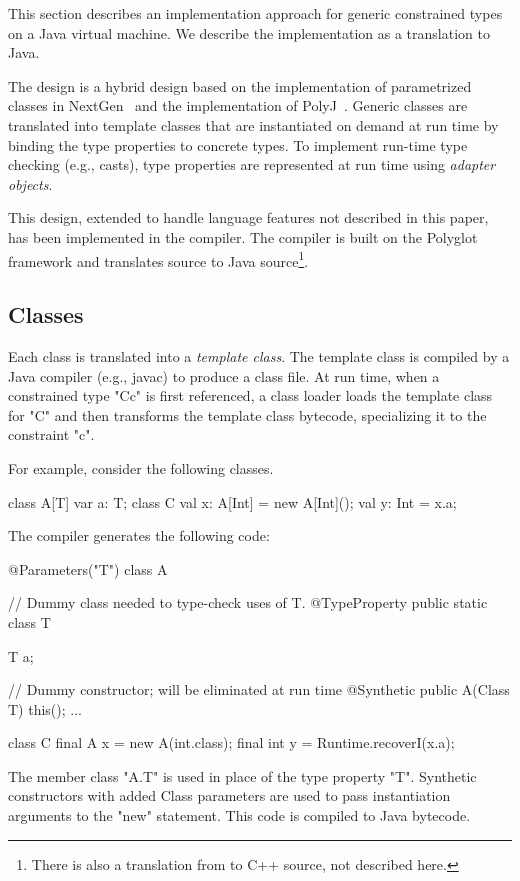 This section describes an implementation approach for
generic constrained types on a Java virtual machine.
We describe the implementation as a translation to Java.

The design is a hybrid design based on the implementation of
parametrized classes in NextGen~\cite{nextgen,allen03,allen04} and the
implementation of PolyJ~\cite{java-popl97}.  Generic classes are translated
into template classes that are instantiated on demand at run time by
binding the type properties to concrete types.  To implement run-time
type checking (e.g., casts), type properties are represented at run
time using \emph{adapter objects}.

This design, extended to handle language features
not described in this paper, has been implemented in the \Xten{}
compiler.  The \Xten{} compiler is built on the Polyglot framework
and translates \Xten{} source to Java source\footnote{There is also
a translation from \Xten{} to C++ source, not described here.}.

\subsection{Classes}
Each class is translated into a \emph{template class}.
The template class is compiled by a Java compiler (e.g., javac)
to produce a class file.
At run time, when a constrained type \xcd"C{c}" is first referenced, a
class loader loads the template class for \xcd"C" and then transforms the
template class bytecode, specializing it to the constraint
\xcd"c".

For example, consider the following classes.
{\footnotesize
\begin{xten}
class A[T] {
    var a: T;
}
class C {
    val x: A[Int] = new A[Int]();
    val y: Int = x.a;
}
\end{xten}}

The compiler generates the following code:
{\footnotesize
\begin{xten}
@Parameters({"T"})
class A {
    // Dummy class needed to type-check uses of T.
    @TypeProperty public static class T { }

    T a;

    // Dummy constructor; will be eliminated at run time
    @Synthetic public A(Class T) { this(); }
    ...
}

class C {
    final A x = new A(int.class);
    final int y = Runtime.recoverI(x.a);
}
\end{xten}}

The member class \xcd"A.T" is used in place of the
type property \xcd"T". 
Synthetic constructors with added Class parameters are
used to pass instantiation arguments to the \xcd"new"
statement.
This code is compiled to Java bytecode.

